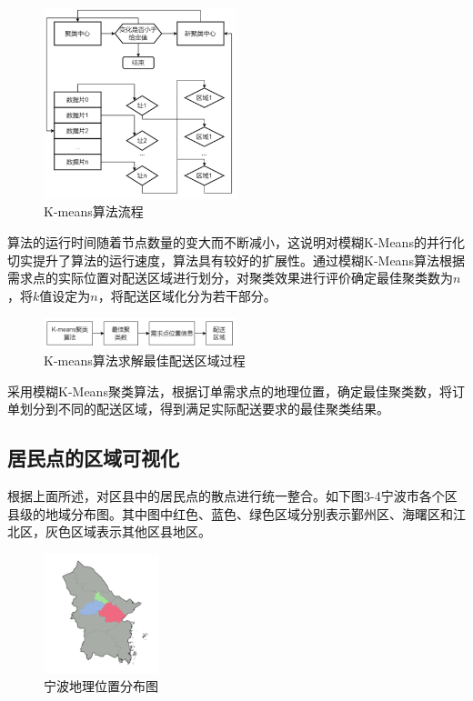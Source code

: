 \begin{figure}[h]
     \centering
     \includegraphics[width=0.5\textwidth]{fig3/fig32.png}
     \caption{K-means算法流程}
     \label{fig:my_label}
 \end{figure}
\FloatBarrier
算法的运行时间随着节点数量的变大而不断减小，这说明对模糊K-Means的并行化切实提升了算法的运行速度，算法具有较好的扩展性。通过模糊K-Means算法根据需求点的实际位置对配送区域进行划分，对聚类效果进行评价确定最佳聚类数为$n$，将$k$值设定为$n$，将配送区域化分为若干部分。

\begin{figure}[h]
     \centering
     \includegraphics[width=0.5\textwidth]{fig3/fig33.png}
     \caption{K-means算法求解最佳配送区域过程}
     \label{fig:my_label}
 \end{figure}
\FloatBarrier
采用模糊K-Means聚类算法，根据订单需求点的地理位置，确定最佳聚类数，将订单划分到不同的配送区域，得到满足实际配送要求的最佳聚类结果。

\subsection{居民点的区域可视化}
根据上面所述，对区县中的居民点的散点进行统一整合。如下图3-4宁波市各个区县级的地域分布图。其中图中红色、蓝色、绿色区域分别表示鄞州区、海曙区和江北区，灰色区域表示其他区县地区。
\begin{figure}[h]
     \centering
     \includegraphics[width=0.3\textwidth]{fig3/fig34.png}
     \caption{宁波地理位置分布图}
     \label{fig:my_label}
\end{figure}
\FloatBarrier
  
